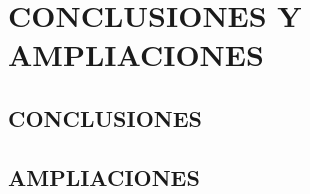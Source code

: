 \newpage
\chapter{CONCLUSIONES Y AMPLIACIONES}
\newpage

\section{CONCLUSIONES}

\newpage
\section{AMPLIACIONES} 

